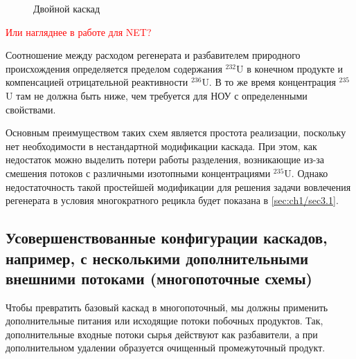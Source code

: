 \begin{figure}[ht]
  \caption{Двойной каскад}\label{fig:diagram1}
\end{figure}

\textcolor{red}{Или нагляднее в работе для NET?}

Соотношение между расходом регенерата и разбавителем природного происхождения определяется пределом содержания $^{232}$U в конечном продукте и компенсацией отрицательной реактивности $^{236}$U. В то же время концентрация $^{235}$U там не должна быть ниже, чем требуется для НОУ с определенными свойствами.

Основным преимуществом таких схем является простота реализации, поскольку нет необходимости в нестандартной модификации каскада. При этом, как недостаток можно выделить потери работы разделения, возникающие из-за смешения потоков с различными изотопными концентрациями $^{235}$U. 
Однако недостаточность такой простейшей модификации для решения задачи вовлечения регенерата в условия многократного рецикла будет показана в \ref{sec:ch1/sec3.1}.


\subsection{Усовершенствованные конфигурации каскадов, например, с несколькими дополнительными внешними потоками (многопоточные схемы)}\label{sec:ch1/sec2.3}
Чтобы превратить базовый каскад в многопоточный, мы должны применить дополнительные питания или исходящие потоки побочных продуктов. Так, дополнительные входные потоки сырья действуют как разбавители, а при дополнительном удалении образуется очищенный промежуточный продукт.

